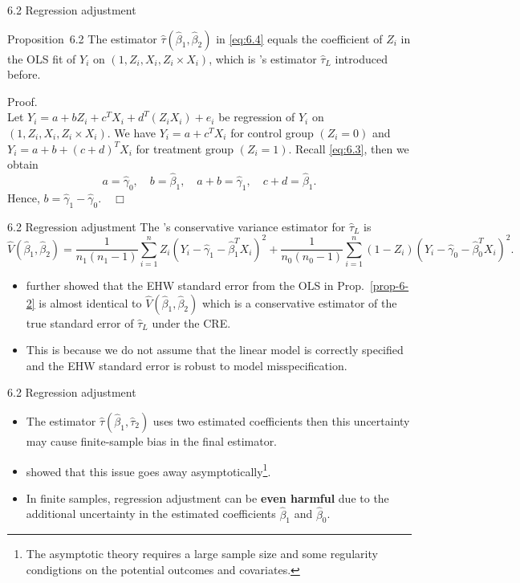 \documentclass[aspectratio=169, 12pt]{beamer}
\begin{document}
\begin{frame}{6.2 Regression adjustment}
  \begin{keybox}{Proposition~6.2}
    The estimator $\widehat{\tau}(\widehat{\beta}_1,\widehat{\beta}_2)$ in \eqref{eq:6.4} equals the coefficient of $Z_i$ in the OLS fit of $Y_i$ on $(1,Z_i,X_i,Z_i\times X_i)$, which is \citet{lin2013agnostic}'s estimator $\widehat{\tau}_L$ introduced before.
    \label{prop-6-2}
  \end{keybox}
  {
    
    Proof.\\
    Let $Y_i=a+bZ_i+c^TX_i+d^T(Z_iX_i)+e_i$ be regression of $Y_i$ on $(1,Z_i,X_i,Z_i\times X_i)$. We have $Y_i=a+c^TX_i$ for control group $(Z_i=0)$ and $Y_i=a+b+(c+d)^TX_i$ for treatment group $(Z_i=1)$. Recall \eqref{eq:6.3}, then we obtain 
    \[
    a=\widehat{\gamma}_0,\quad b=\widehat{\beta}_1, \quad a+b=\widehat{\gamma}_1, \quad c+d=\widehat{\beta}_1.
    \]
    Hence, $b=\widehat{\gamma}_1-\widehat{\gamma}_0. \quad \Box$
  }
\end{frame}

\begin{frame}{6.2 Regression adjustment}
  The \citet{neyman1923application}'s conservative variance estimator for $\widehat{\tau}_L$ is
  \[
  \widehat{V}(\widehat{\beta}_1,\widehat{\beta}_2)
  =\frac{1}{n_1(n_1-1)}\sum_{i=1}^{n}Z_i(Y_i-\widehat{\gamma}_1-\widehat{\beta}_1^TX_i)^2+
  \frac{1}{n_0(n_0-1)}\sum_{i=1}^{n}(1-Z_i)(Y_i-\widehat{\gamma}_0-\widehat{\beta}_0^TX_i)^2.
  \]
  \begin{itemize}
    \item \citet{lin2013agnostic} further showed that the EHW standard error from the OLS in Prop.~\ref{prop-6-2} is almost identical to $\widehat{V}(\widehat{\beta}_1,\widehat{\beta}_2)$ which is a conservative estimator of the true standard error of $\widehat{\tau}_L$ under the CRE.
    \item This is because we do not assume that the linear model is correctly specified and the EHW standard error is robust to model misspecification.
  \end{itemize}
\end{frame}

\begin{frame}{6.2 Regression adjustment}
  \begin{itemize}
    \item The estimator $\widehat{\tau}(\widehat{\beta}_1,\widehat{\tau}_2)$ uses two estimated coefficients then this uncertainty may cause finite-sample bias in the final estimator.
    \item \citet{lin2013agnostic} showed that this issue goes away asymptotically\footnote{The asymptotic theory requires a large sample size and some regularity condigtions on the potential outcomes and covariates.}.
    \item In finite samples, regression adjustment can be \textbf{even harmful} due to the additional uncertainty in the estimated coefficients $\widehat{\beta}_1$ and $\widehat{\beta}_0$.
  \end{itemize}
\end{frame}
\end{document}
